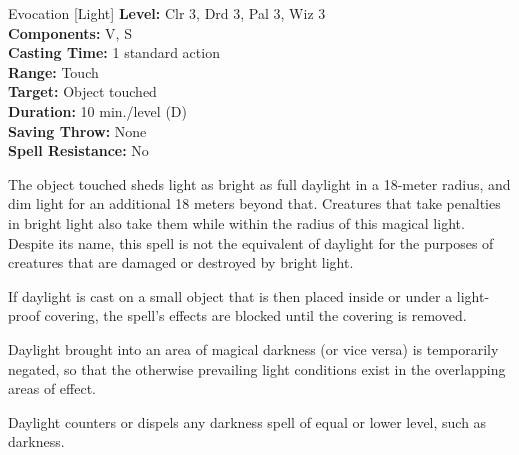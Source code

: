 {Evocation [Light]}
{
	\textbf{Level:}
	Clr 3, Drd 3, Pal 3, Wiz 3\\
	\textbf{Components:}
	V, S\\
	\textbf{Casting Time:}
	1 standard action\\
	\textbf{Range:}
	Touch\\
	\textbf{Target:}
	Object touched\\
	\textbf{Duration:}
	10 min./level (D)\\
	\textbf{Saving Throw:}
	None\\
	\textbf{Spell Resistance:}
	No\\
}
{
	The object touched sheds light as bright as full daylight in a 18-meter radius, and dim light for an additional 18 meters beyond that. Creatures that take penalties in bright light also take them while within the radius of this magical light. Despite its name, this spell is not the equivalent of daylight for the purposes of creatures that are damaged or destroyed by bright light.

	If daylight is cast on a small object that is then placed inside or under a light-proof covering, the spell's effects are blocked until the covering is removed.

	Daylight brought into an area of magical darkness (or vice versa) is temporarily negated, so that the otherwise prevailing light conditions exist in the overlapping areas of effect.

	Daylight counters or dispels any darkness spell of equal or lower level, such as darkness.

}
